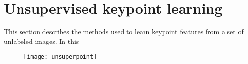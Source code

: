 \section{Unsupervised keypoint learning}

This section describes the methods used to learn keypoint features from a set of unlabeled images. In this 

\begin{figure}[H]
	\centering
	\texttt{[image: unsuperpoint]}
	\caption{}
	\label{fig:unsuperpoint}
\end{figure}